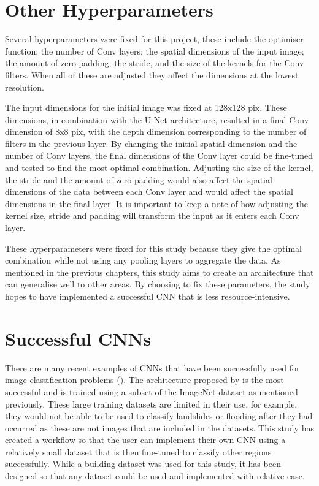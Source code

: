 \section{Other Hyperparameters}
Several hyperparameters were fixed for this project, these include the optimiser function; the number of Conv layers; the spatial dimensions of the input image; the amount of zero-padding, the stride, and the size of the kernels for the Conv filters. When all of these are adjusted they affect the dimensions at the lowest resolution. 
\par
The input dimensions for the initial image was fixed at 128x128 pix. These dimensions, in combination with the U-Net architecture, resulted in a final Conv dimension of 8x8 pix, with the depth dimension corresponding to the number of filters in the previous layer. By changing the initial spatial dimension and the number of Conv layers, the final dimensions of the Conv layer could be fine-tuned and tested to find the most optimal combination. Adjusting the size of the kernel, the stride and the amount of zero padding would also affect the spatial dimensions of the data between each Conv layer and would affect the spatial dimensions in the final layer. It is important to keep a note of how adjusting the kernel size, stride and padding will transform the input as it enters each Conv layer.
\par
These hyperparameters were fixed for this study because they give the optimal combination while not using any pooling layers to aggregate the data. As mentioned in the previous chapters, this study aims to create an architecture that can generalise well to other areas. By choosing to fix these parameters, the study hopes to have implemented a successful CNN that is less resource-intensive. 
\section{Successful CNNs}
There are many recent examples of CNNs that have been successfully used for image classification problems (\cite{audebert18,krizhevsky17, long15, maggiori17a, marmanis16, mnih13, shelhamer17, volpi17}). The architecture proposed by \citet{krizhevsky17} is the most successful and is trained using a subset of the ImageNet dataset as mentioned previously. These large training datasets are limited in their use, for example, they would not be able to be used to classify landslides or flooding after they had occurred as these are not images that are included in the datasets. This study has created a workflow so that the user can implement their own CNN using a relatively small dataset that is then fine-tuned to classify other regions successfully. While a building dataset was used for this study, it has been designed so that any dataset could be used and implemented with relative ease.

